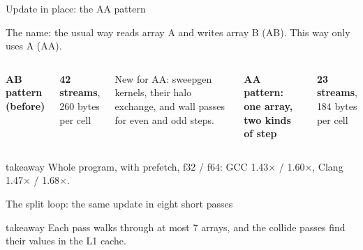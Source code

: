 \documentclass[aspectratio=169,10pt,t]{beamer}
\newcommand{\sx}[1]{#1\ensuremath{\times}} %
\newcommand{\takeaway}[1]{\par\vfill
  \begin{beamercolorbox}[wd=\textwidth,sep=4pt,rounded=true]{takeaway}
    \small #1
  \end{beamercolorbox}}
\begin{document}
\begin{frame}{Update in place: the AA pattern}
  \vspace{1mm}
  {\small The name: the usual way reads array A and writes array B (AB). This way only uses A (AA).\par}
  \begin{columns}[T,onlytextwidth]
    {\small\bfseries AB pattern (before)\par}
    \vspace{3mm}
    \centering

    \vspace{1mm}
    {\small\textbf{42 streams}, 260 bytes per cell\par}

    \vspace{3mm}
    {\scriptsize\color{psgray}New for AA: sweepgen kernels, their halo exchange, and wall passes for
    even and odd steps.\par}
    {\small\bfseries AA pattern: one array, two kinds of step\par}
    \vspace{1mm}
    \centering

    \vspace{1mm}
    {\small\textbf{23 streams}, 184 bytes per cell\par}
  \end{columns}
  \takeaway{Whole program, with prefetch, f32 / f64: GCC \sx{1.43} / \sx{1.60}, Clang \sx{1.47} / \sx{1.68}.}
\end{frame}

\begin{frame}{The split loop: the same update in eight short passes}
  \vspace{5mm}
  \centering
  \takeaway{Each pass walks through at most 7 arrays, and the collide passes find their values in the L1
    cache.}
\end{frame}
\end{document}
